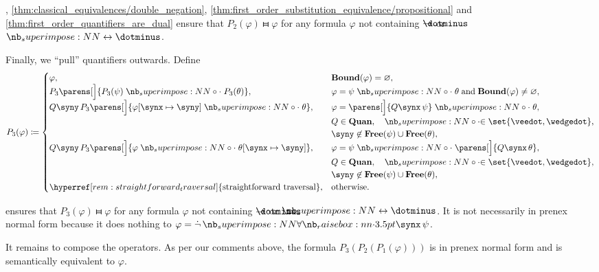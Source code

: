 \begin{algorithm}
\begin{thmenum}
    , \cref{thm:classical_equivalences/double_negation}, \cref{thm:first_order_substitution_equivalence/propositional} and \cref{thm:first_order_quantifiers_are_dual} ensure that \( P_2(\varphi) \gleichstark \varphi \) for any formula \( \varphi \)  not containing \( \synimplies \) or \( \syniff \).

     Finally, we \enquote{pull} quantifiers outwards. Define
    \begin{equation*}
      P_3(\varphi) \coloneqq \begin{cases}
        \varphi,                                                                           &\op*{Bound}(\varphi) = \varnothing, \\
        P_3\parens[\Big]{ P_3(\psi) \syncirc P_3(\theta) },                                &\varphi = \psi \syncirc \theta \T{and} \op*{Bound}(\varphi) \neq \varnothing, \\
        \quantifier Q \syny P_3 \parens[\Big]{ \varphi[\synx \mapsto \syny] \syncirc \theta }, &\varphi = \parens[\Big]{ \quantifier Q \synx \psi } \syncirc \theta, \\
                                                                                           &Q \in \op*{Quan}, \quad \syncirc \in \set{ \synvee, \synwedge }, \\
                                                                                           &\syny \not\in \op*{Free}(\psi) \cup \op*{Free}(\theta), \\
        \quantifier Q \syny P_3 \parens[\Big]{ \varphi \syncirc \theta[\synx \mapsto \syny] }, &\varphi = \psi \syncirc \parens[\Big]{ \quantifier Q \synx \theta }, \\
                                                                                           &Q \in \op*{Quan}, \quad \syncirc \in \set{ \synvee, \synwedge }, \\
                                                                                           &\syny \not\in \op*{Free}(\psi) \cup \op*{Free}(\theta), \\
        \hyperref[rem:straightforward_traversal]{\T{straightforward traversal}},           &\T{otherwise.}
      \end{cases}
    \end{equation*}

     ensures that \( P_3(\varphi) \gleichstark \varphi \) for any formula \( \varphi \) not containing \( \synimplies \) or \( \syniff \). It is not necessarily in prenex normal form because it does nothing to \( \varphi = \synneg \qforall \synx \psi \).
  \end{thmenum}

  It remains to compose the operators. As per our comments above, the formula \( P_3(P_2(P_1(\varphi))) \) is in prenex normal form and is semantically equivalent to \( \varphi \).
\end{algorithm}
